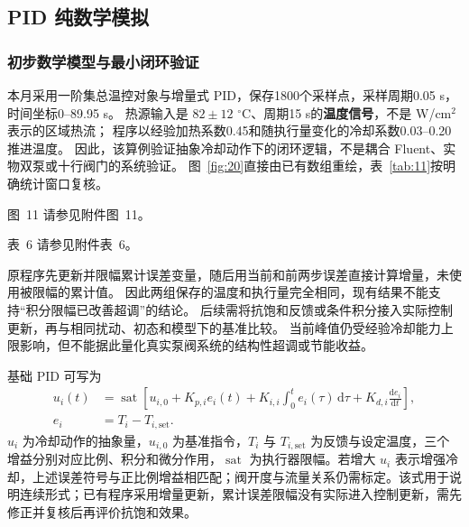 \documentclass[stage2,fontset=fandol]{ydzjreport}
\makeatletter
\newcommand{\submissionnumber}[1]{\def\@currentlabel{#1}}
\makeatother
\begin{document}
\subsection{PID 纯数学模拟}
\subsubsection{初步数学模型与最小闭环验证}

本月采用一阶集总温控对象与增量式 PID，保存1800个采样点，采样周期0.05 s，时间坐标0--89.95 s。
热源输入是 $82\pm12$ $^\circ$C、周期15 s的\textbf{温度信号}，不是 W/cm$^2$ 表示的区域热流；
程序以经验加热系数0.45和随执行量变化的冷却系数0.03--0.20推进温度。
因此，该算例验证抽象冷却动作下的闭环逻辑，不是耦合 Fluent、实物双泵或十行阀门的系统验证。
图~\ref{fig:20}直接由已有数组重绘，表~\ref{tab:11}按明确统计窗口复核\cite{control}。


\par\noindent \begingroup\submissionnumber{11}\label{fig:20}\endgroup 图~11 请参见附件图~11。\par



\par\noindent \begingroup\submissionnumber{6}\label{tab:11}\endgroup 表~6 请参见附件表~6。\par

原程序先更新并限幅累计误差变量，随后用当前和前两步误差直接计算增量，未使用被限幅的累计值。
因此两组保存的温度和执行量完全相同，现有结果不能支持“积分限幅已改善超调”的结论。
后续需将抗饱和反馈或条件积分接入实际控制更新，再与相同扰动、初态和模型下的基准比较。
当前峰值仍受经验冷却能力上限影响，但不能据此量化真实泵阀系统的结构性超调或节能收益。

基础 PID 可写为
\begin{equation}\begin{aligned}
u_i(t)&=\operatorname{sat}\left[u_{i,0}+K_{p,i}e_i(t)+K_{i,i}\int_0^t e_i(\tau)\,\mathrm d\tau+K_{d,i}\frac{\mathrm de_i}{\mathrm dt}\right],\\
e_i&=T_i-T_{i,\mathrm{set}}.
\end{aligned}\label{eq:pid}
\end{equation}
$u_i$ 为冷却动作的抽象量，$u_{i,0}$ 为基准指令，$T_i$ 与 $T_{i,\mathrm{set}}$ 为反馈与设定温度，三个增益分别对应比例、积分和微分作用，$\operatorname{sat}$ 为执行器限幅。若增大 $u_i$ 表示增强冷却，上述误差符号与正比例增益相匹配；阀开度与流量关系仍需标定。该式用于说明连续形式；已有程序采用增量更新，累计误差限幅没有实际进入控制更新，需先修正并复核后再评价抗饱和效果。
\end{document}
